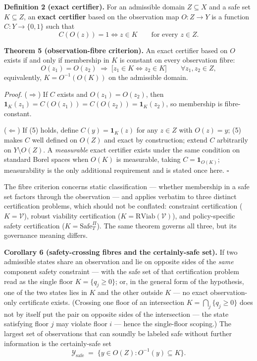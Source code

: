 \documentclass[11pt]{article}
\begin{document}
\textbf{Definition 2 (exact certifier).} For an admissible domain
\(Z \subseteq X\) and a safe set \(K \subseteq Z\), an \textbf{exact
certifier} based on the observation map \(O : Z \to Y\) is a function
\(C : Y \to \{0,1\}\) such that
\[C(O(z)) = 1 \iff z \in K \qquad \text{for every } z \in Z.\]

\textbf{Theorem 5 (observation-fibre criterion).} An exact certifier
based on \(O\) exists if and only if membership in \(K\) is constant on
every observation fibre:
\[O(z_1) = O(z_2) \;\Longrightarrow\; \big[ z_1 \in K \iff z_2 \in K \big] \qquad \forall z_1, z_2 \in Z, \tag{5}\]
equivalently, \(K = O^{-1}(O(K))\) on the admissible domain.

\emph{Proof.} (\(\Rightarrow\)) If \(C\) exists and \(O(z_1) = O(z_2)\),
then \(\mathbf{1}_K(z_1) = C(O(z_1)) = C(O(z_2)) = \mathbf{1}_K(z_2)\),
so membership is fibre-constant.

(\(\Leftarrow\)) If (5) holds, define \(C(y) = \mathbf{1}_K(z)\) for any
\(z \in Z\) with \(O(z) = y\); (5) makes \(C\) well defined on \(O(Z)\)
and exact by construction; extend \(C\) arbitrarily on
\(Y \setminus O(Z)\). A \emph{measurable} exact certifier exists under
the same condition on standard Borel spaces when \(O(K)\) is measurable,
taking \(C = \mathbf{1}_{O(K)}\); measurability is the only additional
requirement and is stated once here. \ensuremath{\square}

The fibre criterion concerns static classification --- whether
membership in a safe set factors through the observation --- and applies
verbatim to three distinct certification problems, which should not be
conflated: constraint certification (\(K = \mathcal{V}\)), robust
viability certification (\(K = \mathrm{RViab}(\mathcal{V})\)), and
policy-specific safety certification (\(K = \mathrm{Safe}^{\Pi}_T\)).
The same theorem governs all three, but its governance meaning differs.

\textbf{Corollary 6 (safety-crossing fibres and the certainly-safe
set).} If two admissible states share an observation and lie on opposite
sides of the \emph{same} component safety constraint --- with the safe
set of that certification problem read as the single floor
\(K = \{ q_j \ge 0 \}\); or, in the general form of the hypothesis, one
of the two states lies in \(K\) and the other outside \(K\) --- no exact
observation-only certificate exists. (Crossing one floor of an
intersection \(K = \bigcap_j \{ q_j \ge 0 \}\) does not by itself put
the pair on opposite sides of the intersection --- the state satisfying
floor \(j\) may violate floor \(i\) --- hence the single-floor scoping.)
The largest set of observations that can soundly be labeled safe without
further information is the certainly-safe set
\[\mathcal{Y}_{\mathrm{safe}} \;=\; \big\{ y \in O(Z) : O^{-1}(y) \subseteq K \big\}.\]
\end{document}
